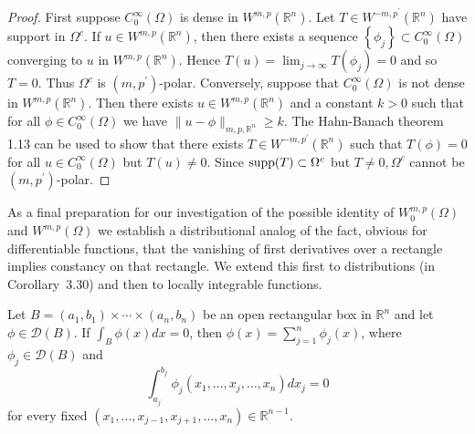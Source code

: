 \begin{proof}
  First suppose $C_0^{\infty}(\Omega)$ is dense in $W^{m,p}\left(\mathbb{R}^n\right)$. Let $T \in W^{-m, p^{\prime}}\left(\mathbb{R}^n\right)$ have support in $\Omega^c$. If $u \in W^{m, p}\left(\mathbb{R}^n\right)$, then there exists a sequence $\left\{\phi_j\right\} \subset C_0^{\infty}(\Omega)$ converging to $u$ in $W^{m,p}\left(\mathbb{R}^n\right)$. Hence $T(u)=\lim _{j \rightarrow \infty} T\left(\phi_j\right)=0$ and so $T=0$. Thus $\Omega^c$ is $\left(m, p^{\prime}\right)$-polar.
  Conversely, suppose that $C_0^{\infty}(\Omega)$ is not dense in $W^{m,p}\left(\mathbb{R}^n\right)$. Then there exists $u \in W^{m, p}\left(\mathbb{R}^n\right)$ and a constant $k>0$ such that for all $\phi \in C_0^{\infty}(\Omega)$ we have $\|u-\phi\|_{m, p, \mathbb{R}^n} \geq k$. The Hahn-Banach theorem 1.13 can be used to show that there exists $T \in W^{-m, p^{\prime}}\left(\mathbb{R}^n\right)$ such that $T(\phi)=0$ for all $u \in C_0^{\infty}(\Omega)$ but $T(u) \neq 0$. Since $\operatorname{supp}(T) \subset \Omega^c$ but $T \neq 0, \Omega^c$ cannot be $\left(m, p^{\prime}\right)$-polar.
\end{proof}

As a final preparation for our investigation of the possible identity of $W_0^{m, p}(\Omega)$ and $W^{m,p}(\Omega)$ we establish a distributional analog of the fact, obvious for differentiable functions, that the vanishing of first derivatives over a rectangle implies constancy on that rectangle. We extend this first to distributions (in Corollary~3.30) and then to locally integrable functions.


\begin{lemma}
  Let $B=\left(a_1, b_1\right) \times \cdots \times\left(a_n, b_n\right)$ be an open rectangular box in $\mathbb{R}^n$ and let $\phi \in \mathscr{D}(B)$. If $\int_B \phi(x) d x=0$, then $\phi(x)=\sum_{j=1}^n \phi_j(x)$, where $\phi_j \in \mathscr{D}(B)$ and
  \begin{equation}\label{eq:3.8}
    \int_{a_j}^{b_j} \phi_j\left(x_1, \ldots, x_j, \ldots, x_n\right) d x_j=0
  \end{equation}
  for every fixed $\left(x_1, \ldots, x_{j-1}, x_{j+1}, \ldots, x_n\right) \in \mathbb{R}^{n-1}$.
\end{lemma}

